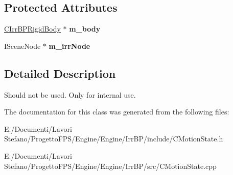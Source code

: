\subsection*{Protected Attributes}
\begin{DoxyCompactItemize}
\item 
\hypertarget{class_c_motion_state_aff461c9f16ad28d27ae2062029514558}{
\hyperlink{class_c_irr_b_p_rigid_body}{CIrrBPRigidBody} $\ast$ {\bfseries m\_\-body}}
\label{class_c_motion_state_aff461c9f16ad28d27ae2062029514558}

\item 
\hypertarget{class_c_motion_state_a010b74f2e84fccdd4f82c2def2c7529d}{
ISceneNode $\ast$ {\bfseries m\_\-irrNode}}
\label{class_c_motion_state_a010b74f2e84fccdd4f82c2def2c7529d}

\end{DoxyCompactItemize}


\subsection{Detailed Description}
Should not be used. Only for internal use. 

The documentation for this class was generated from the following files:\begin{DoxyCompactItemize}
\item 
E:/Documenti/Lavori Stefano/ProgettoFPS/Engine/Engine/IrrBP/include/CMotionState.h\item 
E:/Documenti/Lavori Stefano/ProgettoFPS/Engine/Engine/IrrBP/src/CMotionState.cpp\end{DoxyCompactItemize}

